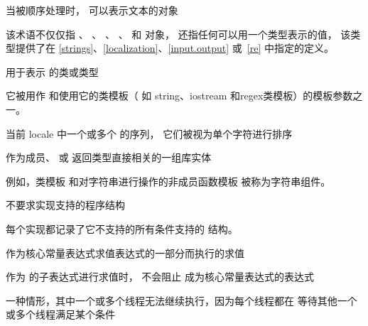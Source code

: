 %
当被顺序处理时，
可以表示文本的对象

\begin{defnote}
该术语不仅仅指
、
、
、
、
和
对象，
还指任何可以用一个类型表示的值，
该类型提供了在
\ref{strings}、\ref{localization}、\ref{input.output} 或~\ref{re} 中指定的定义。
\end{defnote}

%
用于表示  的类或类型

\begin{defnote}
它被用作 
和使用它的类模板（
如 string、iostream 和regex类模板）的模板参数之一。
\end{defnote}

%
当前 locale 中一个或多个  的序列，
它们被视为单个字符进行排序

%
作为成员、 或
返回类型直接相关的一组库实体

\begin{defnote}
例如，类模板 
和对字符串进行操作的非成员函数模板
被称为字符串组件。
\end{defnote}

%
不要求实现支持的程序结构

\begin{defnote}
每个实现都记录了它不支持的所有条件支持的
结构。
\end{defnote}

%
作为核心常量表达式求值表达式的一部分而执行的求值

%
作为
 的子表达式进行求值时，
不会阻止 
成为核心常量表达式的表达式

%
一种情形，其中一个或多个线程无法继续执行，因为每个线程都在
等待其他一个或多个线程满足某个条件

